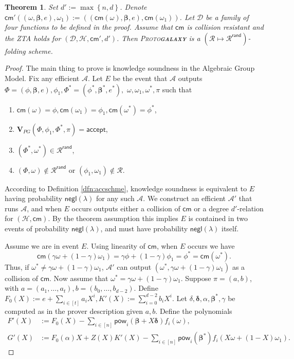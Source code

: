 \documentclass[11pt]{article} %
\newcommand{\protogal}{{\scshape Proto\bfseries{galaxy}}\xspace}
\newcommand{\adv}{\ensuremath{\mathcal A}\xspace}
\newcommand{\advprime}{\ensuremath{{\mathcal A}'}\xspace}
\newcommand{\cm}{\ensuremath{\mathsf{cm}}\xspace}
\newcommand{\negl}{\ensuremath{\mathsf{negl}(\lambda)}\xspace}
\newcommand{\acc}{\ensuremath{\mathsf{accept}}\xspace}
\newcommand{\defeq}{:=}
\newcommand{\hash}{\ensuremath{\mathcal{H}}\xspace}
\newcommand{\prf}{\ensuremath{\mathsf{\pi}}\xspace}
\newcommand{\inst}{\ensuremath{\phi}\xspace}
\newcommand{\wit}{\ensuremath{\mathsf{\omega}}\xspace}
\newcommand{\ver}{\ensuremath{\mathsf{\mathbf{V}}}\xspace}
\newcommand{\verpg}{\ensuremath{\ver_{PG}}\xspace}
\newcommand{\rel}{\ensuremath{\mathcal{R}}\xspace}
\newcommand{\relrand}{\ensuremath{\mathcal{R^{\mathsf{rand}}}}\xspace}
\newcommand{\set}[1]{\ensuremath{\left\{#1\right\}}\xspace}
\newtheorem{thm}[lemma]{Theorem}
\newcommand{\betaa}{\ensuremath{\mathbf{\boldsymbol{\beta}}}\xspace}
\newcommand{\deltaa}{\ensuremath{\mathbf{\boldsymbol{\delta}}}\xspace}
\newcommand{\instt}{\ensuremath{\Phi^*}\xspace}
\newcommand{\insttbase}{\ensuremath{\Phi}\xspace}
\newcommand{\pow}{\ensuremath{\mathsf{pow}}\xspace}
\newcommand{\accscheme}[2]{$(#1\mapsto #2)$-folding scheme\xspace}
\newcommand{\inststar}{\ensuremath{\inst^*}\xspace}
\newcommand{\witstar}{\ensuremath{\wit^*}\xspace}
\newcommand{\ztafuncs}{\ensuremath{\mathcal{D}}\xspace}
\begin{document}
\begin{thm}\label{thm:pgsoundness}
Set $d'\defeq \max \set{ n,d}$. Denote $\cm'((\wit,\betaa,e),\wit_1)\defeq ((\cm(\wit),\betaa,e),\cm(\wit_1))$.
Let \ztafuncs be a family of four functions to be defined in the proof.
Assume that \cm is collision resistant and the ZTA holds for $(\ztafuncs,\hash, \cm',d')$.
Then \protogal is a \accscheme{\rel}{\relrand}.
\end{thm}
\begin{proof}
The main thing to prove is knowledge soundness in the Algebraic Group Model.
 Fix any efficient \adv. Let $E$ be the event that \adv outputs
$\insttbase=(\inst,\betaa,e),\inst_1,\instt=(\inststar,\betaa^*,e^*),$ $\wit,\wit_1,\witstar,\prf$ such that 
\begin{enumerate}
\item $\cm(\wit)=\inst,\cm(\wit_1)=\inst_1,\cm(\witstar)=\inststar$,
\item $\verpg(\insttbase,\inst_1,\instt,\prf)=\acc$,
\item $(\instt,\witstar)\in\relrand$,
\item $(\insttbase,\wit)\notin\relrand$ or $(\inst_1,\wit_1)\notin \rel$.
\end{enumerate}
According to Definition \ref{dfn:accschme}, knowledge soundness is equivalent to $E$ having 
probability \negl for any such \adv.
We construct an efficient \advprime that runs \adv, and when $E$ occurs outputs either a collision of 
\cm or a degree $d'$-relation for $(\hash,\cm)$. By the theorem assumption this implies $E$ is contained in two events of
probability \negl, and must have probability \negl itself.

Assume we are in event $E$.
Using linearity of \cm, when $E$ occurs we have 
\[\cm( \gamma\wit+(1-\gamma)\wit_1)=\gamma \inst +(1-\gamma)\inst_1=\inststar=\cm(\witstar).\]
Thus, if $\witstar \neq \gamma \wit + (1-\gamma)\wit_1$, \advprime can output $(\witstar,\gamma\wit+(1-\gamma)\wit_1)$
as a collision of \cm.
Now assume that $\witstar = \gamma \wit + (1-\gamma)\wit_1$.
Suppose $\prf=(a,b)$, with $a=(a_1,\ldots,a_t),b= (b_0,\ldots,b_{d-2})$.
Define $F_0(X)\defeq e+\sum_{i\in [t]} a_iX^i,K'(X)\defeq \sum_{i=0}^{d-2} b_iX^i$.
Let $\delta,\deltaa,\alpha,\betaa^*, \gamma$ be computed as in the prover description given $a,b$.
Define the polynomials
\begin{align*}
F'(X) &\defeq F_0(X)-\sum_{i\in [n]} \pow_i(\betaa+X\deltaa) f_i(\wit), \\
G'(X) &\defeq F_0(\alpha)X+ Z(X)K'(X)-\sum_{i\in [n]}\pow_i( \betaa^*) f_i(X\wit +(1-X)\wit_1).
\end{align*}


\end{proof}
\end{document}
